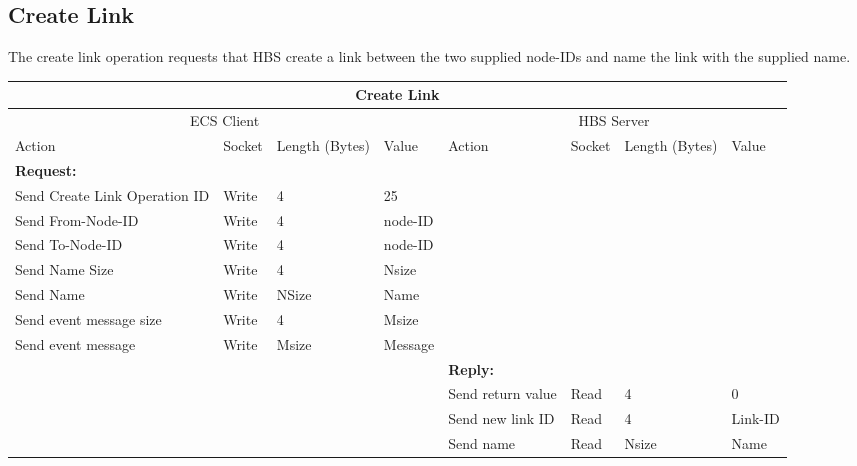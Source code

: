 \newpage
\subsection{Create Link}

The create link operation requests that HBS create a link between the
two supplied node-IDs and name the link with the supplied name.



\bigskip
\small
\begin{tabular}{|p{1.2in}|p{.4in}|p{.4in}|p{.5in}|p{1.2in}|p{.4in}|p{.4in}|p{.5in} |} \hline
\multicolumn{8}{|c|}{{\bf Create Link}} \\ \hline
\multicolumn{4}{|c|}{ECS Client} & \multicolumn{4}{|c|}{HBS Server} \\ \hline
Action            & Socket & Length  
                            (Bytes)& Value & Action       & Socket & Length 
                                                                    (Bytes)& Value \\ \hline
\multicolumn{4}{|l}{{\bf Request:}}&\multicolumn{4}{|l|}{~} \\ \hline
Send Create Link  Operation ID & Write  & 4     & 25     &              &        &       &       \\ \hline
Send From-Node-ID      & Write  & 4     &  node-ID &           &        &       &       \\ \hline
Send To-Node-ID    & Write  & 4     & node-ID   &              &        &       &       \\ \hline
Send Name Size    & Write  & 4     &  Nsize &        &        &       &       \\ \hline
Send Name         & Write  &  NSize &  Name &   &        &       &       \\ \hline
Send event
message size      & Write  & 4     &  Msize &         &        &       &       \\ \hline
Send event message
                  & Write  &  Msize  &  Message &     &        &       &       \\ \hline
\multicolumn{4}{|l}{~}&\multicolumn{4}{|l|}{{\bf Reply:}} \\ \hline
                  &        &       &       & Send return
                                             value        & Read   &  4    & 0       \\ \hline
                  &        &       &       & Send new link ID & Read &  4    &  Link-ID \\ \hline
                  &        &       &       & Send name    & Read   & Nsize &  Name \\ \hline

\end{tabular}
